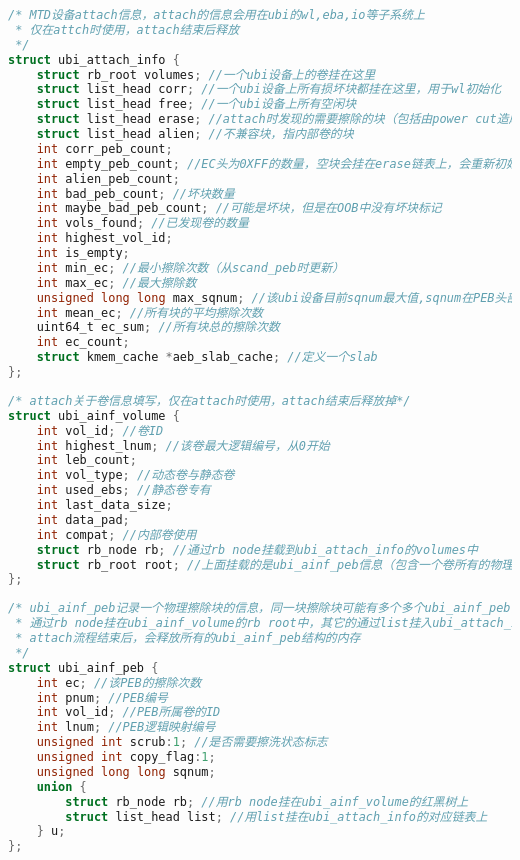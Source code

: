 \begin{lstlisting}[language=C]
/* MTD设备attach信息，attach的信息会用在ubi的wl,eba,io等子系统上
 * 仅在attch时使用，attach结束后释放
 */
struct ubi_attach_info {
	struct rb_root volumes; //一个ubi设备上的卷挂在这里
	struct list_head corr; //一个ubi设备上所有损坏块都挂在这里，用于wl初始化
	struct list_head free; //一个ubi设备上所有空闲块
	struct list_head erase; //attach时发现的需要擦除的块（包括由power cut造成的损坏块)
	struct list_head alien; //不兼容块，指内部卷的块
	int corr_peb_count;
	int empty_peb_count; //EC头为0XFF的数量，空块会挂在erase链表上，会重新初始化
	int alien_peb_count;
	int bad_peb_count; //坏块数量
	int maybe_bad_peb_count; //可能是坏块，但是在OOB中没有坏块标记
	int vols_found; //已发现卷的数量
	int highest_vol_id;
	int is_empty;
	int min_ec; //最小擦除次数（从scand_peb时更新）
	int max_ec; //最大擦除数
	unsigned long long max_sqnum; //该ubi设备目前sqnum最大值,sqnum在PEB头部中
	int mean_ec; //所有块的平均擦除次数
	uint64_t ec_sum; //所有块总的擦除次数
	int ec_count;
	struct kmem_cache *aeb_slab_cache; //定义一个slab
};
\end{lstlisting}

\begin{lstlisting}[language=C]
/* attach关于卷信息填写，仅在attach时使用，attach结束后释放掉*/
struct ubi_ainf_volume {
	int vol_id; //卷ID
	int highest_lnum; //该卷最大逻辑编号，从0开始
	int leb_count;
	int vol_type; //动态卷与静态卷
	int used_ebs; //静态卷专有
	int last_data_size;
	int data_pad;
	int compat; //内部卷使用
	struct rb_node rb; //通过rb node挂载到ubi_attach_info的volumes中
	struct rb_root root; //上面挂载的是ubi_ainf_peb信息（包含一个卷所有的物理擦除块）
};
\end{lstlisting}

\begin{lstlisting}[language=C]
/* ubi_ainf_peb记录一个物理擦除块的信息，同一块擦除块可能有多个多个ubi_ainf_peb，一个
 * 通过rb node挂在ubi_ainf_volume的rb root中，其它的通过list挂入ubi_attach_info中
 * attach流程结束后，会释放所有的ubi_ainf_peb结构的内存
 */
struct ubi_ainf_peb {
	int ec; //该PEB的擦除次数
	int pnum; //PEB编号
	int vol_id; //PEB所属卷的ID
	int lnum; //PEB逻辑映射编号
	unsigned int scrub:1; //是否需要擦洗状态标志
	unsigned int copy_flag:1;
	unsigned long long sqnum;
	union {
		struct rb_node rb; //用rb node挂在ubi_ainf_volume的红黑树上
		struct list_head list; //用list挂在ubi_attach_info的对应链表上
	} u;
};
\end{lstlisting}

\clearpage


